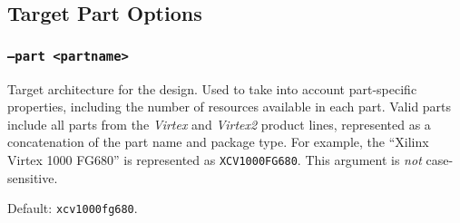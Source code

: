 \subsection{Target Part Options}

\subsubsection{\texttt{--part <partname>}}
Target architecture for the design. Used to take into account 
part-specific properties, including the number of resources available 
in each part. Valid parts include all parts from the \emph{Virtex} and 
\emph{Virtex2} product lines, represented as a concatenation of the part name 
and package type. For example, the ``Xilinx Virtex 1000 FG680'' is represented 
as \texttt{XCV1000FG680}. This argument is \emph{not} case-sensitive.

Default: \texttt{xcv1000fg680}.

